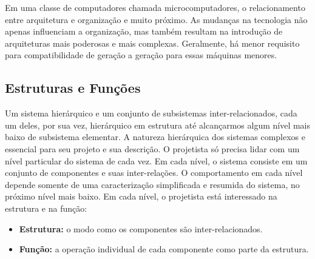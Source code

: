 \documentclass{article}
\begin{document}
Em uma classe de computadores chamada microcomputadores, o relacionamento entre
arquitetura e organização e muito próximo. As mudanças na tecnologia não apenas
influenciam a organização, mas também resultam na introdução de arquiteturas
mais poderosas e mais complexas. Geralmente, há menor requisito para
compatibilidade de geração a geração para essas máquinas menores.

\subsection{Estruturas e Funções}
Um sistema hierárquico e um conjunto de subsistemas inter-relacionados, cada um
deles, por sua vez, hierárquico em estrutura até alcançarmos algum nível mais
baixo de subsistema elementar. A natureza hierárquica dos sistemas complexos e
essencial para seu projeto e sua descrição. O projetista só precisa lidar com
um nível particular do sistema de cada vez. Em cada nível, o sistema consiste
em um conjunto de componentes e suas inter-relações. O comportamento em cada
nível depende somente de uma caracterização simplificada e resumida do sistema,
no próximo nível mais baixo. Em cada nível, o projetista está interessado na
estrutura e na função:

\begin{itemize}
    \item \textbf{Estrutura:} o modo como os componentes são inter-relacionados.
    \item \textbf{Função:} a operação individual de cada componente como parte
        da estrutura.
\end{itemize}
\end{document}
